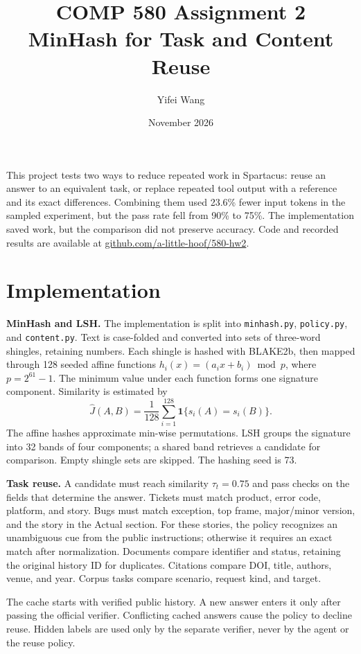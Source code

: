 \documentclass[10pt]{article}
\title{COMP 580 Assignment 2\\MinHash for Task and Content Reuse}
\author{Yifei Wang}
\date{November 2026}
\begin{document}
\maketitle
\vspace{-1.5em}

This project tests two ways to reduce repeated work in Spartacus: reuse an
answer to an equivalent task, or replace repeated tool output with a reference
and its exact differences. Combining them used 23.6\% fewer input tokens in the
sampled experiment, but the pass rate fell from 90\% to 75\%. The implementation
saved work, but the comparison did not preserve accuracy.
Code and recorded results are available at
\href{https://github.com/a-little-hoof/580-hw2}{github.com/a-little-hoof/580-hw2}.

\section{Implementation}
\textbf{MinHash and LSH.} The implementation is split into \texttt{minhash.py},
\texttt{policy.py}, and \texttt{content.py}. Text is case-folded and converted
into sets of three-word shingles, retaining numbers. Each shingle is hashed
with BLAKE2b, then mapped through 128 seeded affine functions
$h_i(x)=(a_i x+b_i)\bmod p$, where $p=2^{61}-1$. The minimum value under each
function forms one signature component. Similarity is estimated by
\[
  \widehat J(A,B)=\frac{1}{128}\sum_{i=1}^{128}
  \mathbf{1}\{s_i(A)=s_i(B)\}.
\]
The affine hashes approximate min-wise permutations. LSH groups the signature
into 32 bands of four components; a shared band retrieves a candidate for
comparison. Empty shingle sets are skipped. The hashing seed is 73.

\textbf{Task reuse.} A candidate must reach similarity $\tau_t=0.75$ and pass
checks on the fields that determine the answer. Tickets must match product,
error code, platform, and story. Bugs must match exception, top frame,
major/minor version, and the story in the Actual section. For these stories,
the policy recognizes an unambiguous cue from the public instructions;
otherwise it requires an exact match after normalization. Documents compare
identifier and status, retaining the original history ID for duplicates.
Citations compare DOI, title, authors, venue, and year. Corpus tasks compare
scenario, request kind, and target.

The cache starts with verified public history. A new answer enters it only
after passing the official verifier. Conflicting cached answers cause the
policy to decline reuse. Hidden labels are used only by the separate verifier,
never by the agent or the reuse policy.
\end{document}
